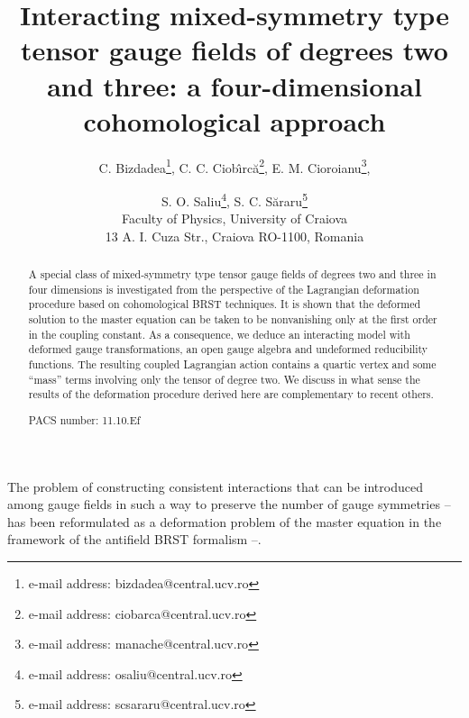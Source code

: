 \documentclass[a4paper,12pt]{article}
\begin{document}
\author{C. Bizdadea\thanks{%
e-mail address: bizdadea@central.ucv.ro}, C. C. Ciob\^{\i }rc\u {a}\thanks{%
e-mail address: ciobarca@central.ucv.ro}, E. M. Cioroianu\thanks{%
e-mail address: manache@central.ucv.ro}, \and S. O. Saliu\thanks{%
e-mail address: osaliu@central.ucv.ro}, S. C. S\u {a}raru\thanks{%
e-mail address: scsararu@central.ucv.ro} \\
Faculty of Physics, University of Craiova\\
13 A. I. Cuza Str., Craiova RO-1100, Romania}
\title{Interacting mixed-symmetry type tensor gauge fields of degrees two and
three: a four-dimensional cohomological approach }
\maketitle

\begin{abstract}
A special class of mixed-symmetry type tensor gauge fields of degrees two
and three in four dimensions is investigated from the perspective of the
Lagrangian deformation procedure based on cohomological BRST techniques. It
is shown that the deformed solution to the master equation can be taken to
be nonvanishing only at the first order in the coupling constant. As a
consequence, we deduce an interacting model with deformed gauge
transformations, an open gauge algebra and undeformed reducibility
functions. The resulting coupled Lagrangian action contains a quartic vertex
and some ``mass'' terms involving only the tensor of degree two. We discuss
in what sense the results of the deformation procedure derived here are
complementary to recent others.

PACS number: 11.10.Ef
\end{abstract}

The problem of constructing consistent interactions that can be introduced
among gauge fields in such a way to preserve the number of gauge symmetries
\cite{alpha1}--\cite{alpha3} has been reformulated as a deformation problem
of the master equation \cite{def} in the framework of the antifield BRST
formalism \cite{1}--\cite{5}.
\end{document}
